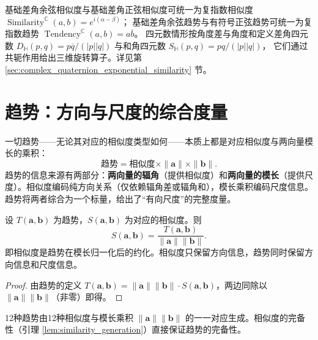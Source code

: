 \begin{remark}[复指数打包与四元数打包]\label{rem:exponential_packaging}
基础差角余弦相似度与基础差角正弦相似度可统一为复指数相似度
$\operatorname{Similarity}^{\mathbb C}(a,b)=e^{i(\alpha-\beta)}$；
基础差角余弦趋势与有符号正弦趋势可统一为复指数趋势
$\operatorname{Tendency}^{\mathbb C}(a,b)=a\overline b$。
四元数情形按角度差与角度和定义差角四元数
$D_{\mathbb H}(p,q)=p\overline q/(|p||q|)$
与和角四元数
$S_{\mathbb H}(p,q)=pq/(|p||q|)$，
它们通过共轭作用给出三维旋转算子。详见第 \ref{sec:complex_quaternion_exponential_similarity} 节。
\end{remark}
\section{\texorpdfstring{趋势：方向与尺度的综合度量}{趋势：方向与尺度的综合度量}}

\begin{definition}[趋势的计算本源]\label{def:tendency_root}
一切趋势——无论其对应的相似度类型如何——本质上都是对应相似度与两向量模长的乘积：
\[
\text{趋势} = \text{相似度} \times \|\mathbf{a}\| \times \|\mathbf{b}\|.
\]
趋势的信息来源有两部分：\textbf{两向量的辐角}（提供相似度）和\textbf{两向量的模长}（提供尺度）。相似度编码纯方向关系（仅依赖辐角差或辐角和），模长乘积编码尺度信息。趋势将两者综合为一个标量，给出了“有向尺度”的完整度量。
\end{definition}

\begin{proposition}[相似度是趋势的约化]\label{prop:similarity_reduction}
设 $T(\mathbf{a},\mathbf{b})$ 为趋势，$S(\mathbf{a},\mathbf{b})$ 为对应的相似度。则
\[
S(\mathbf{a},\mathbf{b}) = \frac{T(\mathbf{a},\mathbf{b})}{\|\mathbf{a}\| \|\mathbf{b}\|}.
\]
即相似度是趋势在模长归一化后的约化。相似度只保留方向信息，趋势同时保留方向信息和尺度信息。
\end{proposition}

\begin{proof}
由趋势的定义 $T(\mathbf{a},\mathbf{b}) = \|\mathbf{a}\| \|\mathbf{b}\| \cdot S(\mathbf{a},\mathbf{b})$，两边同除以 $\|\mathbf{a}\| \|\mathbf{b}\|$（非零）即得。
\end{proof}

\begin{corollary}[12种趋势的完备性]\label{cor:tendency_completeness}
12种趋势由12种相似度与模长乘积 $\|\mathbf{a}\|\|\mathbf{b}\|$ 的一一对应生成。相似度的完备性（引理 \ref{lem:similarity_generation}）直接保证趋势的完备性。
\end{corollary}

